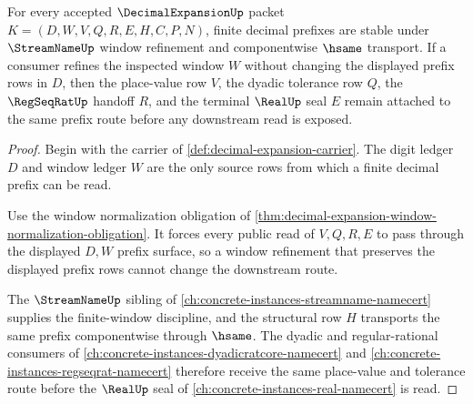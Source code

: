 \begin{theorem}
\label{thm:decimal-expansion-prefix-stability}
For every accepted $\DecimalExpansionUp$ packet $K=(D,W,V,Q,R,E,H,C,P,N)$, finite decimal prefixes are stable under $\StreamNameUp$ window refinement and componentwise $\hsame$ transport. If a consumer refines the inspected window $W$ without changing the displayed prefix rows in $D$, then the place-value row $V$, the dyadic tolerance row $Q$, the $\RegSeqRatUp$ handoff $R$, and the terminal $\RealUp$ seal $E$ remain attached to the same prefix route before any downstream read is exposed.
\end{theorem}
\begin{proof}
Begin with the carrier of \autoref{def:decimal-expansion-carrier}. The digit ledger $D$ and window ledger $W$ are the only source rows from which a finite decimal prefix can be read.

Use the window normalization obligation of \autoref{thm:decimal-expansion-window-normalization-obligation}. It forces every public read of $V,Q,R,E$ to pass through the displayed $D,W$ prefix surface, so a window refinement that preserves the displayed prefix rows cannot change the downstream route.

The $\StreamNameUp$ sibling of \autoref{ch:concrete-instances-streamname-namecert} supplies the finite-window discipline, and the structural row $H$ transports the same prefix componentwise through $\hsame$. The dyadic and regular-rational consumers of \autoref{ch:concrete-instances-dyadicratcore-namecert} and \autoref{ch:concrete-instances-regseqrat-namecert} therefore receive the same place-value and tolerance route before the $\RealUp$ seal of \autoref{ch:concrete-instances-real-namecert} is read.
\end{proof}

